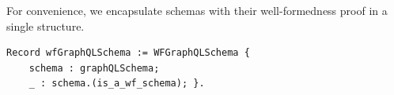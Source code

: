 
For convenience, we encapsulate schemas with their well-formedness
proof in a single structure. 

%

\begin{verbatim}
Record wfGraphQLSchema := WFGraphQLSchema {
    schema : graphQLSchema;
    _ : schema.(is_a_wf_schema); }.
\end{verbatim}




